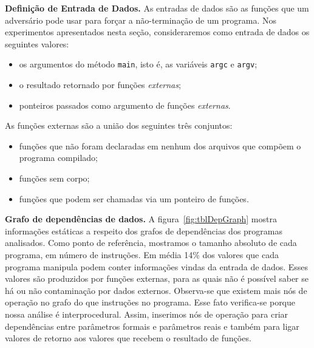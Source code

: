 \documentclass{llncs}
\begin{document}
\noindent
\textbf{Definição de Entrada de Dados.}
As entradas de dados são as funções que um adversário pode usar para forçar
a não-terminação de um programa.
Nos experimentos apresentados nesta seção, consideraremos como entrada de
dados os seguintes valores:
\begin{itemize}
\item os argumentos do método \texttt{main}, isto é, as variáveis \texttt{argc}
e \texttt{argv};
\item o resultado retornado por funções {\em externas};
\item ponteiros passados como argumento de funções {\em externas}.
\end{itemize}
As funções externas são a união dos seguintes três conjuntos:
\begin{itemize}
\item funções que não foram declaradas em nenhum dos arquivos que compõem
o programa compilado;
\item funções sem corpo;
\item funções que podem ser chamadas via um ponteiro de funções.
\end{itemize}

\noindent
\textbf{Grafo de dependências de dados. }
A figura~\ref{fig:tblDepGraph} mostra informações estáticas a respeito dos
grafos de dependências dos programas analisados.
Como ponto de referência, mostramos o tamanho absoluto de cada programa, em
número de  instruções.
Em média 14\% dos valores que cada programa manipula podem
conter informações vindas da entrada de dados.
Esses valores são produzidos por funções externas, para as quais não é
possível saber se há ou não contaminação por dados externos.
Observa-se que existem mais nós de operação no grafo do que instruções no
programa.
Esse fato verifica-se porque nossa análise é interprocedural.
Assim, inserimos nós de operação para criar dependências entre parâmetros
formais e parâmetros reais e também para ligar valores de retorno aos valores
que recebem o resultado de funções.
\end{document}
